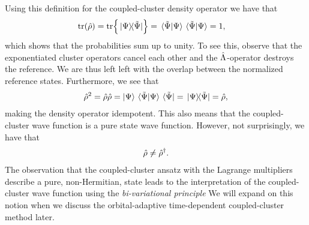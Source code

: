             Using this definition for the coupled-cluster density operator we
            have that
            \begin{align}
                \tr(\density)
                &= \tr{\dyad*{\Psi}{\tilde{\Psi}}}
                = \bra*{\tilde{\Psi}}\ket{\Psi}
                \bra*{\tilde{\Psi}}\ket{\Psi}
                = 1,
            \end{align}
            which shows that the probabilities sum up to unity.
            To see this, observe that the exponentiated cluster operators cancel
            each other and the $\hat{\Lambda}$-operator destroys the reference.
            We are thus left left with the overlap between the normalized
            reference states.
            Furthermore, we see that
            \begin{align}
                \density^2
                = \density\density
                = \ket{\Psi}\braket*{\tilde{\Psi}}{\Psi}
                \bra*{\tilde{\Psi}}
                = \dyad*{\Psi}{\tilde{\Psi}}
                = \density,
            \end{align}
            making the density operator idempotent.
            This also means that the coupled-cluster wave function is a pure
            state wave function.
            However, not surprisingly, we have that
            \begin{align}
                \hat{\rho} \neq \hat{\rho}^{\dagger}.
            \end{align}
            The observation that the coupled-cluster ansatz with the Lagrange
            multipliers describe a pure, non-Hermitian, state leads to the
            interpretation of the coupled-cluster wave function using the
            \emph{bi-variational principle} \cite{arponen1983311, lowdin-bi,
            kvaal2012ab, kvaal2013variational}
            We will expand on this notion when we discuss the orbital-adaptive
            time-dependent coupled-cluster method later.

